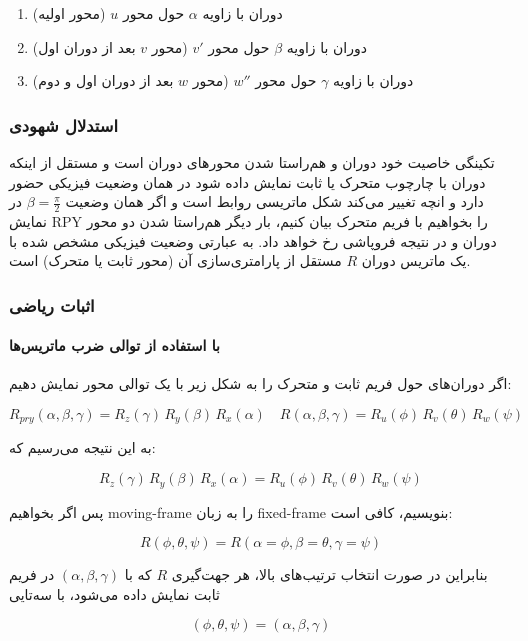 \documentclass{article}
\begin{document}
\begin{enumerate}
	\item دوران با زاویه $\alpha$ حول محور $u$ (محور اولیه) 
	\item دوران با زاویه $\beta$ حول محور $v'$ (محور $v$ بعد از دوران اول) 
	\item دوران با زاویه $\gamma$ حول محور $w''$ (محور $w$ بعد از دوران اول و دوم) 
\end{enumerate}

\subsubsection{ استدلال شهودی}

تکینگی خاصیت خود دوران و هم‌راستا شدن محورهای دوران است و مستقل از اینکه دوران با چارچوب متحرک یا ثابت نمایش داده شود در همان وضعیت فیزیکی حضور دارد و انچه تغییر می‌کند شکل ماتریسی روابط است و اگر همان وضعیت \(\beta = \frac{\pi}{2}\) در نمایش RPY را بخواهیم با فریم متحرک بیان کنیم، بار دیگر هم‌راستا شدن دو محور دوران و در نتیجه فروپاشی رخ خواهد داد. به عبارتی وضعیت فیزیکی مشخص شده با یک ماتریس دوران \(R\) مستقل از پارامتری‌سازی آن (محور ثابت یا متحرک) است. 

\subsubsection{اثبات ریاضی}

\paragraph{با استفاده از توالی ضرب ماتریس‌ها}

اگر دوران‌های حول فریم ثابت و متحرک را به شکل زیر با یک توالی محور نمایش دهیم:

\[
R_{pry}(\alpha,\beta,\gamma)
= R_z(\gamma)\, R_y(\beta)\, R_x(\alpha)
\quad
R(\alpha,\beta,\gamma)
= R_u(\phi)\,R_v(\theta)\,R_w(\psi)
\]

به این نتیجه می‌رسیم که:

\[
R_z(\gamma)\, R_y(\beta)\, R_x(\alpha)
= 
R_u(\phi)\,R_v(\theta)\,R_w(\psi)
\]

پس اگر بخواهیم moving-frame را به زبان fixed-frame بنویسیم، کافی است:

\[
R(\phi,\theta,\psi) = R(\alpha=\phi,\beta=\theta,\gamma=\psi)
\]

بنابراین در صورت انتخاب ترتیب‌های بالا، هر جهت‌گیری \(R\) که با \((\alpha,\beta,\gamma)\) در فریم ثابت نمایش داده می‌شود، با سه‌تایی

\[
(\phi,\theta,\psi) = (\alpha,\beta,\gamma)
\]
\end{document}
